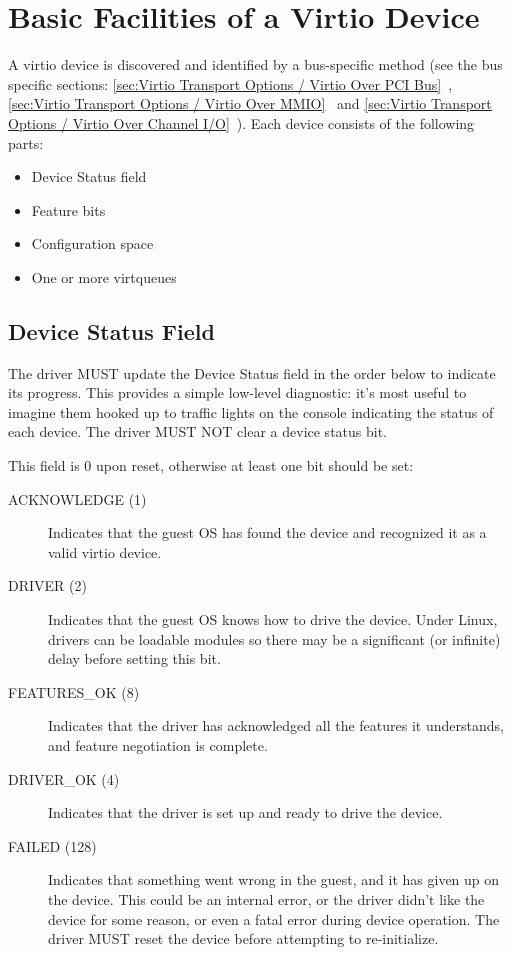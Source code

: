 \chapter{Basic Facilities of a Virtio Device}\label{sec:Basic Facilities of a Virtio Device}

A virtio device is discovered and identified by a bus-specific method
(see the bus specific sections: \ref{sec:Virtio Transport Options / Virtio Over PCI Bus}~,
\ref{sec:Virtio Transport Options / Virtio Over MMIO}~ and \ref{sec:Virtio Transport Options / Virtio Over Channel I/O}~).  Each
device consists of the following parts:

\begin{itemize}
\item Device Status field
\item Feature bits
\item Configuration space
\item One or more virtqueues
\end{itemize}

\section{Device Status Field}\label{sec:Basic Facilities of a Virtio Device / Device Status Field}

The driver MUST update the Device Status field in the order below to
indicate its progress. This provides a simple low-level diagnostic:
it's most useful to imagine them hooked up to traffic lights on the
console indicating the status of each device.  The driver MUST NOT
clear a device status bit.

This field is 0 upon reset, otherwise at least one bit should be set:

\begin{description}
\item[ACKNOWLEDGE (1)] Indicates that the guest OS has found the
  device and recognized it as a valid virtio device.

\item[DRIVER (2)] Indicates that the guest OS knows how to drive the
  device. Under Linux, drivers can be loadable modules so there
  may be a significant (or infinite) delay before setting this
  bit.

\item[FEATURES_OK (8)] Indicates that the driver has acknowledged all the
  features it understands, and feature negotiation is complete.

\item[DRIVER_OK (4)] Indicates that the driver is set up and ready to
  drive the device.

\item[FAILED (128)] Indicates that something went wrong in the guest,
  and it has given up on the device. This could be an internal
  error, or the driver didn't like the device for some reason, or
  even a fatal error during device operation. The driver MUST
  reset the device before attempting to re-initialize.
\end{description}

